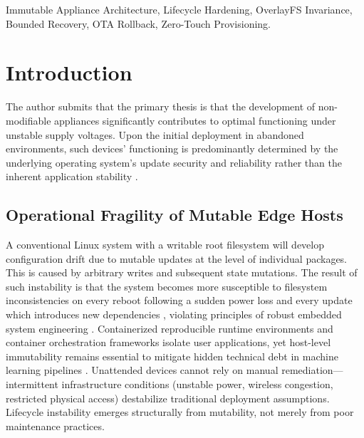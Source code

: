 \documentclass[conference]{IEEEtran}
\begin{document}
\begin{IEEEkeywords}
Immutable Appliance Architecture, Lifecycle Hardening, OverlayFS Invariance, Bounded Recovery, OTA Rollback, Zero-Touch Provisioning.
\end{IEEEkeywords}

\section{Introduction}

The author submits that the primary thesis is that the development of non-modifiable appliances significantly contributes to optimal functioning under unstable supply voltages. Upon the initial deployment in abandoned environments, such devices’ functioning is predominantly determined by the underlying operating system’s update security and reliability rather than the inherent application stability \cite{b1, b2, b3}.

\subsection{Operational Fragility of Mutable Edge Hosts}
A conventional Linux system with a writable root filesystem will develop configuration drift due to mutable updates at the level of individual packages. This is caused by arbitrary writes and subsequent state mutations. The result of such instability is that the system becomes more susceptible to filesystem inconsistencies on every reboot following a sudden power loss and every update which introduces new dependencies \cite{b4, b12, b18}, violating principles of robust embedded system engineering \cite{b15}. Containerized reproducible runtime environments \cite{b8, b10} and container orchestration frameworks \cite{b9} isolate user applications, yet host-level immutability remains essential to mitigate hidden technical debt in machine learning pipelines \cite{b5}. Unattended devices cannot rely on manual remediation---intermittent infrastructure conditions (unstable power, wireless congestion, restricted physical access) destabilize traditional deployment assumptions. Lifecycle instability emerges structurally from mutability, not merely from poor maintenance practices.
\end{document}
